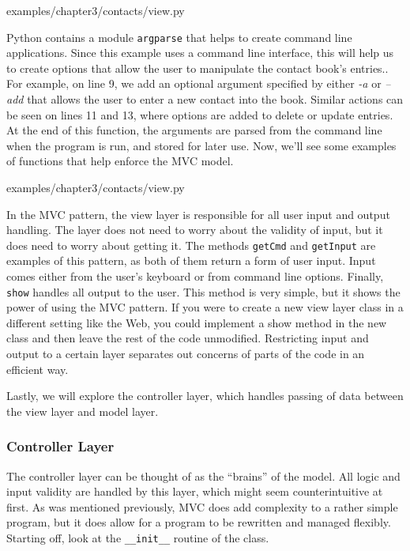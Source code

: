 \documentclass[12pt, oneside, a4paper]{book}
\begin{document}
      
      {examples/chapter3/contacts/view.py}

      Python contains a module \lstinline!argparse! that helps to create command line applications.
      Since this example uses a command line interface, this will help us to create options that allow the user to manipulate the contact book's entries..
      For example,  on line 9, we add an optional argument specified by either \textit{-a} or \textit{--add} that allows the user to enter a new contact into the book.
      Similar actions can be seen on lines 11 and 13, where options are added to delete or update entries.
      At the end of this function, the arguments are parsed from the command line when the program is run, and stored for later use.
      Now, we'll see some examples of functions that help enforce the MVC model.

      
      {examples/chapter3/contacts/view.py}

      In the MVC pattern, the view layer is responsible for all user input and output handling.
      The layer does not need to worry about the validity of input, but it does need to worry about getting it.
      The methods \lstinline!getCmd! and \lstinline!getInput! are examples of this pattern, as both of them return a form of user input.
      Input comes either from the user's keyboard or from command line options.
      Finally, \lstinline!show! handles all output to the user.
      This method is very simple, but it shows the power of using the MVC pattern.
      If you were to create a new view layer class in a different setting like the Web, you could implement a show method in the new class and then leave the rest of the code unmodified.
      Restricting input and output to a certain layer separates out concerns of parts of the code in an efficient way.

      Lastly, we will explore the controller layer, which handles passing of data between the view layer and model layer.

      \subsubsection{Controller Layer}
      The controller layer can be thought of as the ``brains'' of the model.
      All logic and input validity are handled by this layer, which might seem counterintuitive at first.
      As was mentioned previously, MVC does add complexity to a rather simple program, but it does allow for a program to be rewritten and managed flexibly.
      Starting off, look at the \lstinline!__init__! routine of the class.
      
\end{document}
